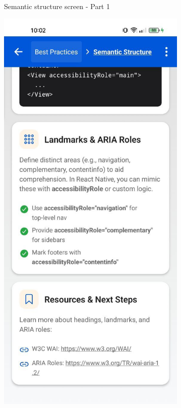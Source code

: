 \begin{enumerate}
\begin{itemize}
\begin{figure}[ht]
\begin{subfigure}[b]{0.48\textwidth}
                \caption{Semantic structure screen - Part 1}
                \label{fig:semantics-left}
            \end{subfigure}
            \hfill
            \begin{subfigure}[b]{0.48\textwidth}
                \centering
                \includegraphics[width=\linewidth, alt={Second part of the Semantic structure screen}]{img/semantics2.jpg}

\end{subfigure}
\end{figure}
\end{itemize}
\end{enumerate}
